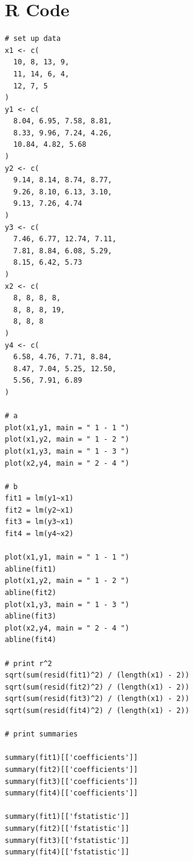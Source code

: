 \documentclass{article}
\begin{document}
\section*{R Code}
\begin{verbatim}
# set up data
x1 <- c(
  10, 8, 13, 9,
  11, 14, 6, 4,
  12, 7, 5
)
y1 <- c(
  8.04, 6.95, 7.58, 8.81,
  8.33, 9.96, 7.24, 4.26,
  10.84, 4.82, 5.68
)
y2 <- c(
  9.14, 8.14, 8.74, 8.77,
  9.26, 8.10, 6.13, 3.10,
  9.13, 7.26, 4.74
)
y3 <- c(
  7.46, 6.77, 12.74, 7.11,
  7.81, 8.84, 6.08, 5.29,
  8.15, 6.42, 5.73
)
x2 <- c(
  8, 8, 8, 8,
  8, 8, 8, 19,
  8, 8, 8
)
y4 <- c(
  6.58, 4.76, 7.71, 8.84,
  8.47, 7.04, 5.25, 12.50,
  5.56, 7.91, 6.89
)

# a
plot(x1,y1, main = " 1 - 1 ")
plot(x1,y2, main = " 1 - 2 ")
plot(x1,y3, main = " 1 - 3 ")
plot(x2,y4, main = " 2 - 4 ")

# b
fit1 = lm(y1~x1)
fit2 = lm(y2~x1)
fit3 = lm(y3~x1)
fit4 = lm(y4~x2)

plot(x1,y1, main = " 1 - 1 ")
abline(fit1)
plot(x1,y2, main = " 1 - 2 ")
abline(fit2)
plot(x1,y3, main = " 1 - 3 ")
abline(fit3)
plot(x2,y4, main = " 2 - 4 ")
abline(fit4)

# print r^2
sqrt(sum(resid(fit1)^2) / (length(x1) - 2))
sqrt(sum(resid(fit2)^2) / (length(x1) - 2))
sqrt(sum(resid(fit3)^2) / (length(x1) - 2))
sqrt(sum(resid(fit4)^2) / (length(x1) - 2))

# print summaries

summary(fit1)[['coefficients']]
summary(fit2)[['coefficients']]
summary(fit3)[['coefficients']]
summary(fit4)[['coefficients']]

summary(fit1)[['fstatistic']]
summary(fit2)[['fstatistic']]
summary(fit3)[['fstatistic']]
summary(fit4)[['fstatistic']]
\end{verbatim}
\end{document}
